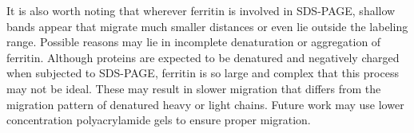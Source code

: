 \documentclass[a4paper,10pt]{article}
\begin{document}
\begin{multicols}{2}
It is also worth noting that wherever ferritin is involved in SDS-PAGE, shallow bands appear that migrate much smaller distances or even lie outside the labeling range. Possible reasons may lie in incomplete denaturation or aggregation of ferritin. Although proteins are expected to be denatured and negatively charged when subjected to SDS-PAGE, ferritin is so large and complex that this process may not be ideal. These may result in slower migration that differs from the migration pattern of denatured heavy or light chains. Future work may use lower concentration polyacrylamide gels to ensure proper migration.





\end{multicols}


\clearpage
\end{document}
